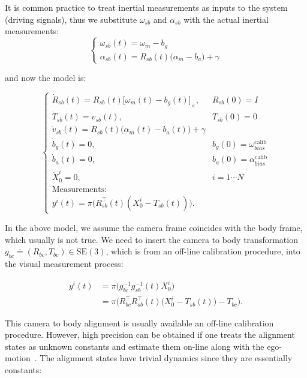 \documentclass[letter,10pt]{article}
\newcommand{\SE}[1]{ \mathrm{SE(#1)} }
\newcommand{\asym}[1]{{\lbrack #1\rbrack}_\times{}}
\begin{document}
It is common practice to treat inertial measurements as inputs to the system (driving signals), thus we substitute $\omega_{sb}$ and $\alpha_{sb}$ with the actual inertial measurements:
\begin{equation*}
\begin{cases}
\omega_{sb}(t) = \omega_{m}-b_g\\
\alpha_{sb}(t) = R_{sb}(t)\big( \alpha_{m} - b_a\big) + \gamma
\end{cases}
\end{equation*}

and now the model is:

\begin{equation*}
\begin{cases}
\dot{R}_{sb}(t)=R_{sb}(t)\asym{\omega_{m}(t)-b_g(t)}, &R_{sb}(0)=I\\
\dot{T}_{sb}(t)=v_{sb}(t), &T_{sb}(0)=0\\
\dot{v}_{sb}(t)= R_{sb}(t)\big( \alpha_m(t) - b_a(t) \big) + \gamma\\
\dot b_g(t)=0, & b_g(0)=\omega_{bias}^{\text{calib}}\\
\dot b_a(t)=0, & b_a(0)=\alpha_{bias}^{\text{calib}}\\
\dot{X}_0^i=0, &i=1\cdots N\\
\text{Measurements:}\\
y^i(t)=\pi\big(R_{sb}^\top(t)(X_0^i-T_{sb}(t))\big).
\end{cases}
\end{equation*}

In the above model, we assume the camera frame coincides with the body frame, which usually is not true. We need to insert the camera to body transformation $g_{bc}\doteq (R_{bc}, T_{bc}) \in \SE{3}$, which is from an off-line calibration procedure, into the visual measurement process:

\begin{equation}
\begin{aligned}
y^i(t) 
&= \pi \Big( g_{bc}^{-1} g_{sb}^{-1}(t)X_0^i \Big)\\
&= \pi \Big(R_{bc}^\top R_{sb}^\top(t)\big( X_0^i - T_{sb}(t)\big)-T_{bc} \Big).
\end{aligned}
\label{eq-vismeas}
\end{equation}

This camera to body alignment is usually available an off-line calibration procedure. However, high precision can be obtained if one treats the alignment states as unknown constants and estimate them on-line along with the ego-motion~\cite{li2012improving}. The alignment states have trivial dynamics since they are essentially constants:
\end{document}
